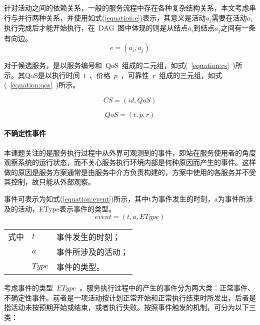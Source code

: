 针对活动之间的依赖关系，一般的服务流程中存在各种复杂结构关系，本文考虑串行与并行两种关系，并使用如式(\ref{equation:e})表示，其意义是活动${a_j}$需要在活动${a_i}$执行完成后才能开始执行，在~DAG~图中体现的则是从结点${a_i}$到结点${a_j}$之间有一条有向边。
\begin{equation}\label{equation:e}
e = ({a_i},{a_j})
\end{equation}

对于候选服务，是以服务编号和~QoS~组成的二元组，如式(~\ref{equation:cs}~)所示。其QoS是以执行时间~$t$~、价格~$p$~，可靠性~$r$~组成的三元组，如式(~\ref{equation:qos}~)所示。

\begin{equation}\label{equation:cs}
CS = (id, QoS)
\end{equation}

\begin{equation}\label{equation:qos}
QoS = (t, p, r)
\end{equation}

\paragraph{不确定性事件} \label{sec:uc_event}

本课题关注的是服务执行过程中从外界可观测到的事件，即站在服务使用者的角度观察系统的运行状态，而不关心服务执行环境内部是何种原因而产生的事件。这样做的原因是服务方案通常是由服务中介方负责构建的，方案中使用的各服务并不受其控制，故只能从外部观察。

事件可表示为如式(\ref{equation:event})所示，其中t为事件发生的时刻，a为事件所涉及的活动，EType表示事件的类型。
\begin{equation}\label{equation:event}
event = (t, a, EType)
\end{equation}
\begin{tabularx}{\textwidth}{@{}l@{\quad}l@{\pozhehao }X@{}}
    式中
    & $t$ & 事件发生的时刻；\\
    & $a$ & 事件所涉及的活动；\\
    & $Type$ &事件的类型。
\end{tabularx}\vspace{\wordsep}

考虑事件的类型~$EType$~。服务执行过程中的产生的事件分为两大类：正常事件、不确定性事件。前者是一项活动按计划正常开始和正常执行结束时所发出，后者是指活动未按预期开始或结束，或者执行失败。按照事件触发的机制，可分为以下三类：


